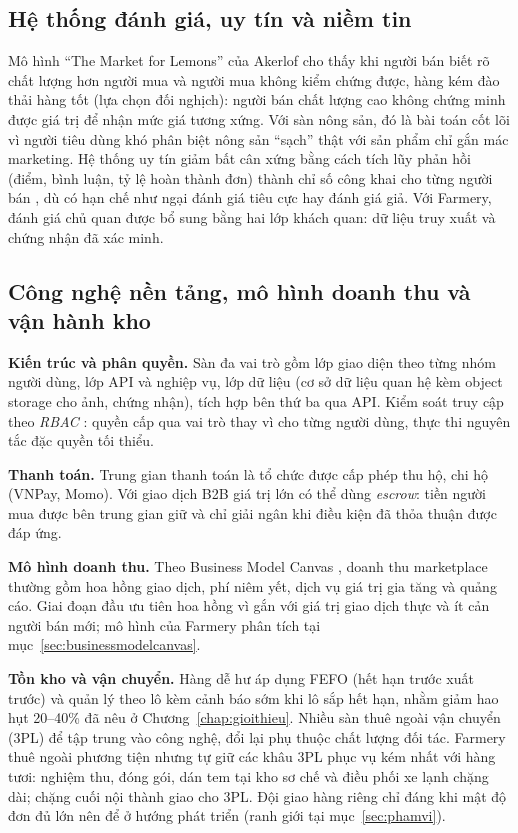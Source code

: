 \subsection{Hệ thống đánh giá, uy tín và niềm tin}
\label{subsec:reputation}

Mô hình ``The Market for Lemons'' của Akerlof \parencite{akerlof1970lemons} cho thấy khi người bán biết rõ chất lượng hơn người mua và người mua không kiểm chứng được, hàng kém đào thải hàng tốt (lựa chọn đối nghịch): người bán chất lượng cao không chứng minh được giá trị để nhận mức giá tương xứng. Với sàn nông sản, đó là bài toán cốt lõi vì người tiêu dùng khó phân biệt nông sản ``sạch'' thật với sản phẩm chỉ gắn mác marketing. Hệ thống uy tín giảm bất cân xứng bằng cách tích lũy phản hồi (điểm, bình luận, tỷ lệ hoàn thành đơn) thành chỉ số công khai cho từng người bán \parencite{springer_article}, dù có hạn chế như ngại đánh giá tiêu cực hay đánh giá giả. Với Farmery, đánh giá chủ quan được bổ sung bằng hai lớp khách quan: dữ liệu truy xuất và chứng nhận đã xác minh.

\subsection{Công nghệ nền tảng, mô hình doanh thu và vận hành kho}
\label{subsec:businessmodel}

\textbf{Kiến trúc và phân quyền.} Sàn đa vai trò gồm lớp giao diện theo từng nhóm người dùng, lớp API và nghiệp vụ, lớp dữ liệu (cơ sở dữ liệu quan hệ kèm object storage cho ảnh, chứng nhận), tích hợp bên thứ ba qua API. Kiểm soát truy cập theo \emph{RBAC} \parencite{sandhu1996rbac}: quyền cấp qua vai trò thay vì cho từng người dùng, thực thi nguyên tắc đặc quyền tối thiểu.

\textbf{Thanh toán.} Trung gian thanh toán là tổ chức được cấp phép thu hộ, chi hộ (VNPay, Momo). Với giao dịch B2B giá trị lớn có thể dùng \emph{escrow}: tiền người mua được bên trung gian giữ và chỉ giải ngân khi điều kiện đã thỏa thuận được đáp ứng.

\textbf{Mô hình doanh thu.} Theo Business Model Canvas \parencite{osterwalder2010bmc}, doanh thu marketplace thường gồm hoa hồng giao dịch, phí niêm yết, dịch vụ giá trị gia tăng và quảng cáo. Giai đoạn đầu ưu tiên hoa hồng vì gắn với giá trị giao dịch thực và ít cản người bán mới; mô hình của Farmery phân tích tại mục~\ref{sec:businessmodelcanvas}.

\label{subsec:khobai}
\textbf{Tồn kho và vận chuyển.} Hàng dễ hư áp dụng FEFO (hết hạn trước xuất trước) và quản lý theo lô kèm cảnh báo sớm khi lô sắp hết hạn, nhằm giảm hao hụt 20--40\% đã nêu ở Chương~\ref{chap:gioithieu}. Nhiều sàn thuê ngoài vận chuyển (3PL) để tập trung vào công nghệ, đổi lại phụ thuộc chất lượng đối tác. Farmery thuê ngoài phương tiện nhưng tự giữ các khâu 3PL phục vụ kém nhất với hàng tươi: nghiệm thu, đóng gói, dán tem tại kho sơ chế và điều phối xe lạnh chặng dài; chặng cuối nội thành giao cho 3PL. Đội giao hàng riêng chỉ đáng khi mật độ đơn đủ lớn nên để ở hướng phát triển (ranh giới tại mục~\ref{sec:phamvi}).

